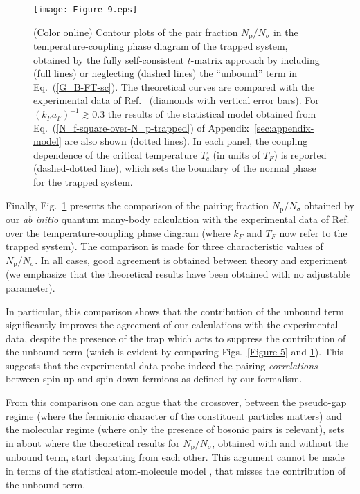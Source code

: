 \documentclass[pra,twocolumn,aps,amssymb,showpacs,superscriptaddress]{revtex4-1}
\begin{document}
\begin{figure}[t]
\begin{center}
\texttt{[image: Figure-9.eps]}
\caption{(Color online) Contour plots of the pair fraction $N_{\mathrm{p}}/N_{\sigma}$ in the temperature-coupling phase diagram of the trapped system, obtained by the fully self-consistent 
                                    $t$-matrix approach by including (full lines) or neglecting (dashed lines) the ``unbound'' term in Eq.~(\ref{G_B-FT-sc}).
                                    The theoretical curves are compared with the experimental data of Ref.~\cite{Ulm-Cam-2019} (diamonds with vertical error bars).
                                    For $(k_{F} a_{F})^{-1} \gtrsim 0.3$ the results of the statistical model obtained from Eq.~(\ref{N_f-square-over-N_p-trapped}) of 
                                    Appendix~\ref{sec:appendix-model} are also shown (dotted lines).
                                    In each panel, the coupling dependence of the critical temperature $T_{c}$ (in units of $T_{F}$) is reported (dashed-dotted line), which sets the boundary of the normal phase 
                                    for the trapped system.}
\label{Figure-9}
\end{center}
\end{figure} 


Finally, Fig.~\ref{Figure-9} presents the comparison of the pairing fraction $N_{\mathrm{p}}/N_{\sigma}$ obtained by our \emph{ab initio} quantum many-body calculation with the experimental data of  Ref.~\cite{Ulm-Cam-2019} over the temperature-coupling phase diagram (where $k_{F}$ and $T_{F}$ now refer to the trapped system). The comparison is made for three characteristic values of $N_{\mathrm{p}}/N_{\sigma}$.
In all cases, good agreement is obtained between theory and experiment (we emphasize that the theoretical results have been obtained with no adjustable parameter).

In particular, this comparison shows that the contribution of the unbound term significantly improves the agreement of our calculations with the experimental data, despite the presence of the trap which acts to suppress the contribution of the unbound term (which is evident by comparing Figs.~\ref{Figure-5} and \ref{Figure-9}). This suggests that the experimental data probe indeed the pairing \emph{correlations} between spin-up and spin-down fermions as defined by our formalism. 

From this comparison one can argue that the crossover, between the pseudo-gap regime (where the fermionic character of the constituent particles matters) and the molecular regime (where only the presence of bosonic pairs is relevant), sets in about where the theoretical results for $N_{\mathrm{p}}/N_{\sigma}$, obtained with and without the unbound term, start departing from each other.
This argument cannot be made in terms of the statistical atom-molecule model \cite{Ulm-Cam-2019}, that misses the contribution of the unbound term.
\end{document}
